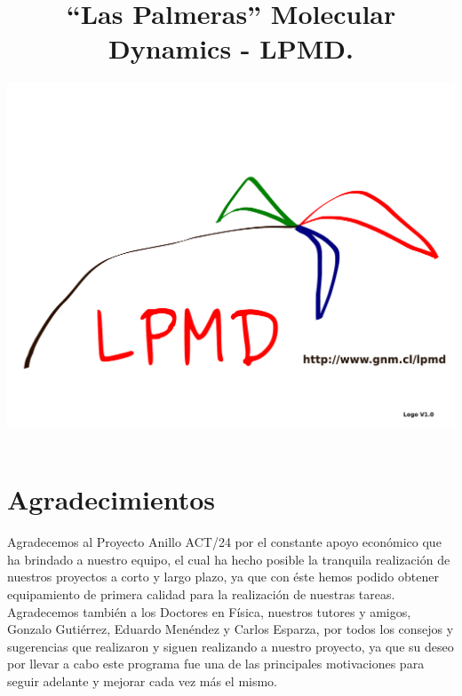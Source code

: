\documentclass[a4paper,10pt]{scrbook}
\begin{document}
\author{\includegraphics[scale=.35]{logo-lpmd.pdf}}
\title{``Las Palmeras'' Molecular Dynamics - \textbf{LPMD}.}
\maketitle


\chapter*{Agradecimientos}

Agradecemos al Proyecto Anillo ACT/24 por el constante apoyo econ\'omico que ha brindado a nuestro equipo, el cual ha hecho posible la tranquila realizaci\'on de nuestros proyectos a corto y largo plazo, ya que con \'este hemos podido obtener equipamiento de primera calidad para la realizaci\'on de nuestras tareas. Agradecemos tambi\'en a los Doctores en F\'isica, nuestros tutores y amigos, Gonzalo Guti\'errez, Eduardo Men\'endez y Carlos Esparza, por todos los consejos y sugerencias que realizaron y siguen realizando a nuestro proyecto, ya que su deseo por llevar a cabo este programa fue una de las principales motivaciones para seguir adelante y mejorar cada vez m\'as el mismo.
\end{document}
